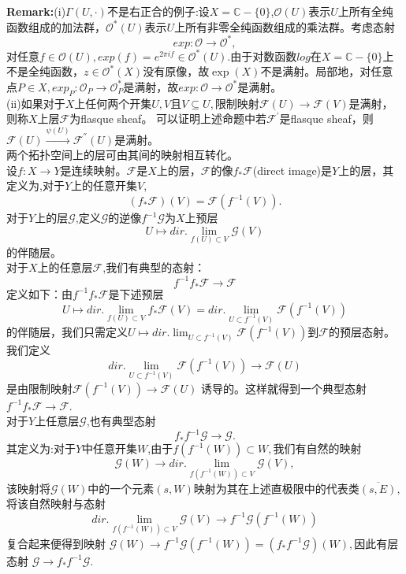 \documentclass[UTF8]{article}
\begin{document}
\textbf{Remark:}(i)$\Gamma(U,\cdot)$不是右正合的例子:设$X=\mathbb{C}-\{0\}$,$\mathcal{O}(U)$表示$U$上所有全纯函数组成的加法群，$\mathcal{O}^{*}(U)$表示$U$上所有非零全纯函数组成的乘法群。考虑态射$$
exp:\mathcal{O}\rightarrow \mathcal{O}^{*},
$$
对任意$f\in \mathcal{O}(U),exp(f)=e^{2\pi if}\in \mathcal{O}^{*}(U).$由于对数函数$log$在$X=\mathbb{C}-\{0\}$上不是全纯函数，$z\in \mathcal{O}^{*}(X)$没有原像，故$\exp(X)$不是满射。局部地，对任意点$P\in X,exp_{P}:\mathcal{O}_{P}\rightarrow \mathcal{O}^{*}_{P}$是满射，故$exp:\mathcal{O}\rightarrow \mathcal{O}^{*}$是满射。\\
(ii)如果对于$X$上任何两个开集$U,V$且$V\subseteq U,$限制映射$\mathcal{F}(U)\rightarrow \mathcal{F}(V)$是满射，
则称$X$上层$\mathcal{F}$为flasque sheaf。
可以证明上述命题中若$\mathcal{F}^{'}$是flasque sheaf，则$\mathcal{F}(U)\stackrel{\psi(U)}{\longrightarrow}\mathcal{F}^{''}(U)$是满射。\\


	两个拓扑空间上的层可由其间的映射相互转化。\\
   设$f:X\rightarrow Y$是连续映射。$\mathcal{F}$是$X$上的层，$\mathcal{F}$的像$f_{*}\mathcal{F}$(direct image)是$Y$上的层，其定义为,对于$Y$上的任意开集$V$,
   $$
   (f_{*}\mathcal{F})(V)=\mathcal{F}(f^{-1}(V)).
   $$
   对于$Y$上的层$\mathcal{G}$,定义$\mathcal{G}$的逆像$f^{-1}\mathcal{G}$为$X$上预层
   $$
   U\mapsto dir.\lim_{f(U)\subset V}\mathcal{G}(V) 
   $$
	的伴随层。\\
	
	对于$X$上的任意层$\mathcal{F}$,我们有典型的态射：
	$$
	f^{-1}f_{*}\mathcal{F}\rightarrow \mathcal{F}
	$$
	定义如下：由$f^{-1}f_{*}\mathcal{F}$是下述预层
	$$
	U\mapsto dir.\lim_{f(U)\subset V} f_{*}\mathcal{F}(V)=dir.\lim_{U\subset f^{-1}(V)} \mathcal{F}(f^{-1}(V))
	$$
	的伴随层，我们只需定义$U\mapsto dir.\lim_{U\subset f^{-1}(V)} \mathcal{F}(f^{-1}(V))$到$\mathcal{F}$的预层态射。
我们定义
$$dir.\lim_{U\subset f^{-1}(V)} \mathcal{F}(f^{-1}(V))\rightarrow  \mathcal{F}(U)$$是由限制映射$\mathcal{F}(f^{-1}(V))\rightarrow \mathcal{F}(U)$
诱导的。这样就得到一个典型态射$f^{-1}f_{*}\mathcal{F}\rightarrow \mathcal{F}$.\\

对于$Y$上任意层$\mathcal{G}$,也有典型态射
$$
f_{*}f^{-1}\mathcal{G}\rightarrow \mathcal{G}.
$$
其定义为:对于$Y$中任意开集$W$,由于$f(f^{-1}(W))\subset W,$我们有自然的映射
$$
\mathcal{G}(W)\rightarrow dir.\lim_{f(f^{-1}(W))\subset V} \mathcal{G}(V),
$$
该映射将$\mathcal{G}(W)$中的一个元素$(s,W)$映射为其在上述直极限中的代表类$\overline{(s,E)},$将该自然映射与态射
$$dir.\lim_{f(f^{-1}(W))\subset V} \mathcal{G}(V)\rightarrow f^{-1}\mathcal{G}(f^{-1}(W))$$复合起来便得到映射
$\mathcal{G}(W)\rightarrow f^{-1}\mathcal{G}(f^{-1}(W))=(f_{*}f^{-1}\mathcal{G})(W),$因此有层态射
$\mathcal{G}\rightarrow f_{*}f^{-1}\mathcal{G}.$\\
\end{document}
